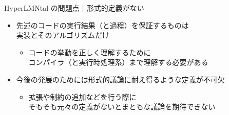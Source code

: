 \begin{frame}{HyperLMNtal の問題点｜形式的定義がない}
  \begin{itemize}
  \item
    先述のコードの実行結果（と過程）を保証するものは\\
    実装とそのアルゴリズムだけ
    \begin{itemize}
    \item
      コードの挙動を正しく理解するために\\
      コンパイラ（と実行時処理系）まで理解する必要がある
    \end{itemize}
  \item
    今後の発展のためには形式的議論に耐え得るような定義が不可欠
    \begin{itemize}
    \item
      拡張や制約の追加などを行う際に\\
      そもそも元々の定義がないとまともな議論を期待できない
    \end{itemize}
    
  \end{itemize}  
\end{frame}
